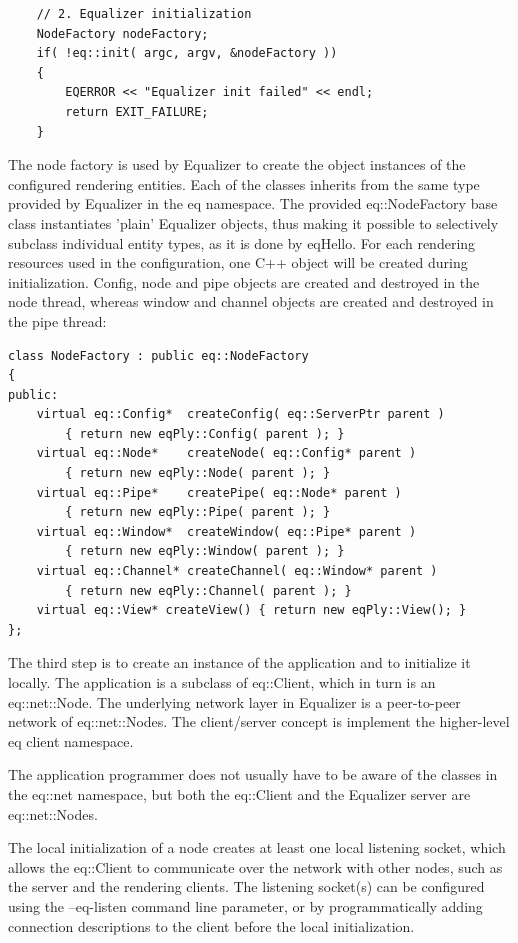 \documentclass[10pt,a4]{scrartcl}
\begin{document}
{\footnotesize\begin{lstlisting}
    // 2. Equalizer initialization
    NodeFactory nodeFactory;
    if( !eq::init( argc, argv, &nodeFactory ))
    {
        EQERROR << "Equalizer init failed" << endl;
        return EXIT_FAILURE;
    }
\end{lstlisting}}%

The node factory is used by Equalizer to create the object instances of
the configured rendering entities. Each of the classes inherits from the
same type provided by Equalizer in the \textsf{eq} namespace. The
provided \textsf{eq::NodeFactory} base class instantiates 'plain'
Equalizer objects, thus making it possible to selectively subclass
individual entity types, as it is done by \textsf{eqHello}. For each
rendering resources used in the configuration, one C++ object will be
created during initialization. Config, node and pipe objects are created and
destroyed in the node thread, whereas window and channel objects are
created and destroyed in the pipe thread:

{\footnotesize\begin{lstlisting}
class NodeFactory : public eq::NodeFactory
{
public:
    virtual eq::Config*  createConfig( eq::ServerPtr parent )
        { return new eqPly::Config( parent ); }
    virtual eq::Node*    createNode( eq::Config* parent )  
        { return new eqPly::Node( parent ); }
    virtual eq::Pipe*    createPipe( eq::Node* parent )
        { return new eqPly::Pipe( parent ); }
    virtual eq::Window*  createWindow( eq::Pipe* parent )
        { return new eqPly::Window( parent ); }
    virtual eq::Channel* createChannel( eq::Window* parent )
        { return new eqPly::Channel( parent ); }
    virtual eq::View* createView() { return new eqPly::View(); }
};
\end{lstlisting}}

The third step is to create an instance of the application and to
initialize it locally. The application is a subclass of
\textsf{eq::Client}, which in turn is an \textsf{eq::net::Node}. The
underlying network layer in Equalizer is a peer-to-peer network of
\textsf{eq::net::Node}s. The client/server concept is implement the
higher-level \textsf{eq} client namespace.

The application programmer does not usually have to be aware of the
classes in the \textsf{eq::net} namespace, but both the
\textsf{eq::Client} and the Equalizer server are
\textsf{eq::net::Node}s.

The local initialization of a node creates at least one local listening
socket, which allows the \textsf{eq::Client} to communicate over the
network with other nodes, such as the server and the rendering
clients. The listening socket(s) can be configured using the
\textsf{--eq-listen} command line parameter, or by programmatically
adding connection descriptions to the client before the local
initialization.
\end{document}
